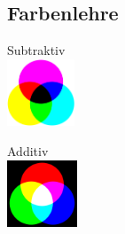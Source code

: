 \subsection{Farbenlehre}

\begin{center}
	\begin{minipage}{0.2\textwidth}
		Subtraktiv \\
		\includegraphics[height=2cm,keepaspectratio=true]{Images/farbenkreise_subtraktiv.png}
	\end{minipage}%
	\begin{minipage}{0.2\textwidth}
		Additiv \\
		\includegraphics[height=2cm,keepaspectratio=true]{Images/farbenkreise_additiv.png}
	\end{minipage}
\end{center}
